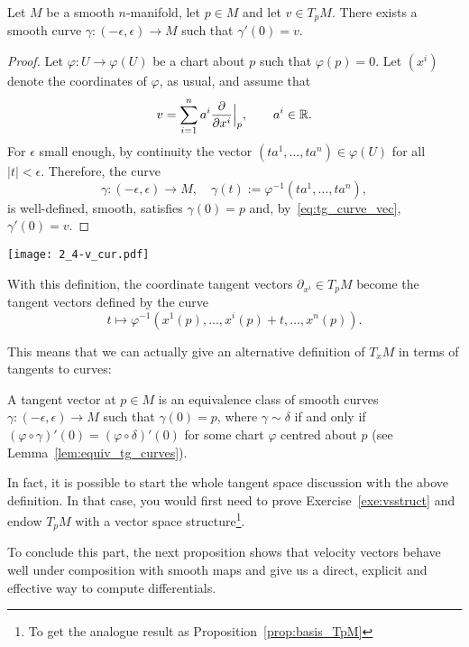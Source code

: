 \begin{theorem}
  Let $M$ be a smooth $n$-manifold, let $p\in M$ and let $v\in T_pM$.
  There exists a smooth curve $\gamma: (-\epsilon,\epsilon) \to M$ such that $\gamma'(0) = v$.
\end{theorem}
\begin{proof}
  Let $\varphi:U\to\varphi(U)$ be a chart about $p$ such that $\varphi(p)=0$.
  Let $(x^i)$ denote the coordinates of $\varphi$, as usual, and assume that
  \begin{equation}
    v = \sum_{i=1}^n a^i \frac{\partial}{\partial x^i}\Big|_p, \qquad a^i \in\mathbb{R}.
  \end{equation}
  For $\epsilon$ small enough, by continuity the vector $(ta^1, \ldots, ta^n) \in \varphi(U)$ for all $|t|<\epsilon$. Therefore, the curve
  \begin{equation}
    \gamma: (-\epsilon, \epsilon) \to M, \quad \gamma(t):=\varphi^{-1}(ta^1, \ldots, ta^n),
  \end{equation}
  is well-defined, smooth, satisfies $\gamma(0) = p$ and, by~\eqref{eq:tg_curve_vec}, $\gamma'(0) = v$.
\end{proof}

\begin{marginfigure}
  \texttt{[image: 2\_4-v\_cur.pdf]}
  \caption{With this definition, the coordinate tangent vectors $\partial_{x^i}\in T_p M$ become the tangent vectors defined by the curve \[t \mapsto \varphi^{-1}(x^1(p), \ldots, {x^i(p) + t}, \ldots, x^n(p)).\]}
  \label{fig:2_4-v_cur}
\end{marginfigure}
This means that we can actually give an alternative definition of $T_xM$ in terms of tangents to curves:
\begin{definition}\label{def:tg:ascurvespeed}
  A tangent vector at $p\in M$ is an equivalence class of smooth curves $\gamma:(-\epsilon, \epsilon)\to M$ such that $\gamma(0)=p$, where $\gamma\sim\delta$ if and only if $(\varphi\circ \gamma)'(0) = (\varphi\circ\delta)'(0)$ for some chart $\varphi$ centred about $p$ (see Lemma~\ref{lem:equiv_tg_curves}).
\end{definition}

In fact, it is possible to start the whole tangent space discussion with the above definition. In that case, you would first need to prove Exercise~\ref{exe:vsstruct} and endow $T_pM$ with a vector space structure\footnote{To get the analogue result as Proposition~\ref{prop:basis_TpM}}.

To conclude this part, the next proposition shows that velocity vectors behave well under composition with smooth maps and give us a direct, explicit and effective way to compute differentials.

